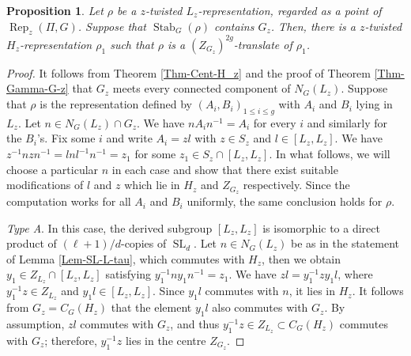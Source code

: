 \documentclass[11pt,oneside,dvipsnames]{amsart}
\theoremstyle{plain}
\newtheorem{Prop}[Thm]{Proposition}
\theoremstyle{definition}
\theoremstyle{named}
\DeclareMathOperator{\Rep}{Rep}
\DeclareMathOperator{\SL}{SL}
\DeclareMathOperator{\Stab}{Stab}
\begin{document}
\begin{Prop}\label{Prop-Gz-Hz}
Let $\rho$ be a $z$-twisted $L_z$-representation, regarded as a point of $\Rep_z(\Pi,G)$. Suppose that $\Stab_G(\rho)$ contains $G_z$. Then, there is a $z$-twisted $H_z$-representation $\rho_1$ such that $\rho$ is a $(Z_{G_z})^{2g}$-translate of $\rho_1$.
\end{Prop} 
\begin{proof}
It follows from Theorem \ref{Thm-Cent-H_z} and the proof of Theorem \ref{Thm-Gamma-G-z} that $G_z$ meets every connected component of $N_G(L_z)$. Suppose that $\rho$ is the representation defined by $(A_i,B_i)_{1\le i\le g}$ with $A_i$ and $B_i$ lying in $L_z$. Let $n\in N_G(L_z)\cap G_z$. We have $nA_in^{-1}=A_i$ for every $i$ and similarly for the $B_i$'s. Fix some $i$ and write $A_i=zl$ with $z\in S_z$ and $l\in[L_z,L_z]$. We have $z^{-1}nzn^{-1}=lnl^{-1}n^{-1}=z_1$ for some $z_1\in S_z\cap [L_z,L_z]$. In what follows, we will choose a particular $n$ in each case and show that there exist suitable modifications of $l$ and $z$ which lie in $H_z$ and $Z_{G_z}$ respectively. Since the computation works for all $A_i$ and $B_i$ uniformly, the same conclusion holds for $\rho$.
 
\textit{Type A}. In this case, the derived subgroup $[L_z,L_z]$ is isomorphic to a direct product of $(\ell+1)/d$-copies of $\SL_d$. Let $n\in N_G(L_z)$ be as in the statement of Lemma \ref{Lem-SL-L-tau}, which commutes with $H_z$, then we obtain $y_1\in Z_{L_z}\cap [L_z,L_z]$ satisfying $y_1^{-1}ny_1n^{-1}=z_1$. We have $zl=y_1^{-1}zy_1l$, where $y_1^{-1}z\in Z_{L_z}$ and $y_1l\in[L_z,L_z]$. Since $y_1l$ commutes with $n$, it lies in $H_z$. It follows from $G_z=C_G(H_z)$ that the element $y_1l$ also commutes with $G_z$. By assumption, $zl$ commutes with $G_z$, and thus $y_1^{-1}z\in Z_{L_z}\subset C_G(H_z)$ commutes with $G_z$; therefore, $y_1^{-1}z$ lies in the centre $Z_{G_z}$.


\end{proof}
\end{document}
